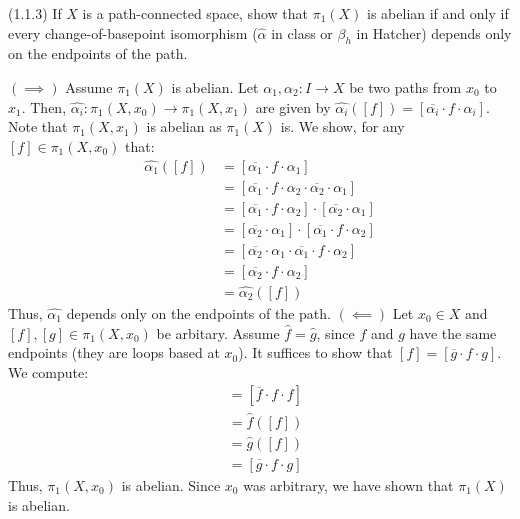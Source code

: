 \documentclass[12pt]{article}
\begin{document}
\begin{problem}{3}
(1.1.3) If \( X \) is a path-connected space, show that \( \pi_1(X) \) is abelian if and only if every change-of-basepoint isomorphism (\( \hat{\alpha} \) in class or \( \beta_h \) in Hatcher) depends only on the endpoints of the path.
\end{problem}
\begin{solution}
    $(\implies)$ Assume $\pi_1(X)$ is abelian. Let $\alpha_1, \alpha_2: I \to X$ be two paths from $x_0$ to $x_1$. Then, $\hat{\alpha_i}: \pi_1(X, x_0) \to \pi_1(X, x_1)$ are given by $\hat{\alpha_i}([f]) = [\overline{\alpha_i} \cdot f \cdot \alpha_i]$. Note that $\pi_1(X, x_1)$ is abelian as $\pi_1(X)$ is. We show, for any $[f] \in \pi_1(X, x_0)$ that:
    \begin{align*}
        \hat{\alpha_1}([f]) &= [\overline{\alpha_1} \cdot f \cdot \alpha_1] \\
        &= [\overline{\alpha_1} \cdot f \cdot \alpha_2 \cdot \overline{\alpha_2} \cdot \alpha_1] \\
        &= [\overline{\alpha_1} \cdot f \cdot \alpha_2] \cdot [\overline{\alpha_2} \cdot \alpha_1] \\
        &= [\overline{\alpha_2} \cdot \alpha_1] \cdot [\overline{\alpha_1} \cdot f \cdot \alpha_2] \\
        &= [\overline{\alpha_2} \cdot \alpha_1 \cdot \overline{\alpha_1} \cdot f \cdot \alpha_2] \\
        &= [\overline{\alpha_2} \cdot f \cdot \alpha_2] \\
        &= \hat{\alpha_2}([f])
    \end{align*} 
    Thus, $\hat{\alpha_1}$ depends only on the endpoints of the path. \bbni
    $(\impliedby)$ Let $x_0 \in X$ and $[f], [g] \in \pi_1(X, x_0)$ be arbitary. Assume $\hat{f} = \hat{g}$, since $f$ and $g$ have the same endpoints (they are loops based at $x_0$). It suffices to show that $[f] = [\overline{g} \cdot f \cdot g]$. We compute:
    \begin{align*}
        [f] &= [\overline{f} \cdot f \cdot f] \\
        &= \hat{f}([f]) \\
        &= \hat{g}([f]) \\
        &= [\overline{g} \cdot f \cdot g]
    \end{align*}
    Thus, $\pi_1(X, x_0)$ is abelian. Since $x_0$ was arbitrary, we have shown that $\pi_1(X)$ is abelian.
\end{solution}
\newpage
\end{document}
